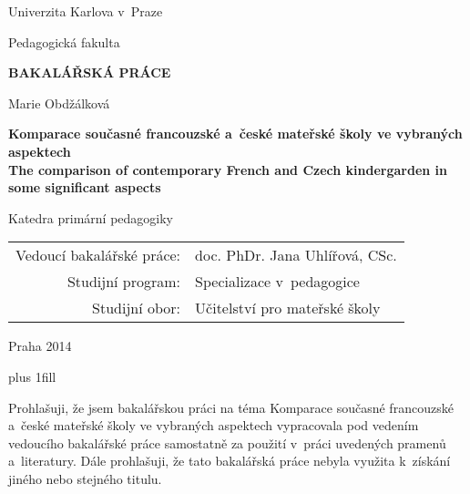 \documentclass[12pt,a4paper,singleside,openright]{report}
\newcommand{\mujNazevPrace}{Komparace současné francouzské a~české mateřské školy ve vybraných aspektech}
\newcommand{\mujNazevPraceAJ}{The comparison of contemporary French and Czech kindergarden in some significant aspects}
\newcommand{\mujVedouci}{doc. PhDr. Jana Uhlířová, CSc.}
\newcommand{\mujKatedra}{Katedra primární pedagogiky}
\newcommand{\mujProgram}{Specializace v~pedagogice}
\newcommand{\mujObor}{Učitelství pro mateřské školy}
\begin{document}


\pagestyle{empty}
\begin{center}

\large

Univerzita Karlova v~Praze

\medskip

Pedagogická fakulta

\vfill

{\bf\Large BAKALÁŘSKÁ PRÁCE}

\vfill


\vfill
\vspace{5mm}

{\LARGE Marie Obdžálková}

\vspace{15mm}

{\LARGE\bfseries
	\mujNazevPrace
\large\bfseries \\
\vspace{8mm}
	\mujNazevPraceAJ
}

\vfill

\mujKatedra

\vfill

\begin{tabular}{rl}

Vedoucí bakalářské práce: & \mujVedouci \\
\noalign{\vspace{2mm}}
Studijní program: & \mujProgram \\
\noalign{\vspace{2mm}}
Studijní obor: & \mujObor \\
\end{tabular}

\vfill

Praha 2014

\end{center}

\newpage

	\vglue 0pt plus 1fill

	\noindent
	Prohlašuji, že jsem bakalářskou práci na téma Komparace současné francouzské a~české mateřské školy ve vybraných aspektech vypracovala pod vedením vedoucího bakalářské práce samostatně za použití v práci uvedených pramenů a~literatury. Dále prohlašuji, že tato bakalářská práce nebyla využita k získání jiného nebo stejného titulu.
\end{document}
